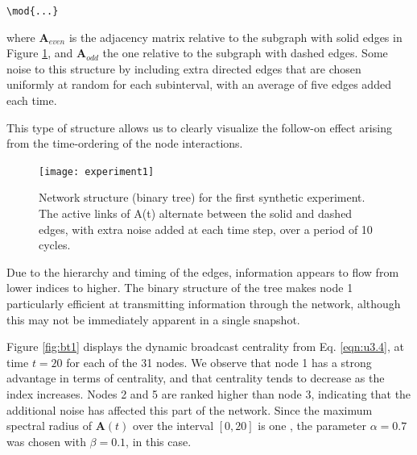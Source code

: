  \verb+\mod{...}+


where $\mathbf{A}_{even}$ is the adjacency matrix relative to the subgraph with solid edges in Figure \ref{fig:exp1}, and $\mathbf{A}_{odd}$ the one relative to the subgraph with dashed edges. Some noise  to this structure  by including extra directed edges that are chosen uniformly at random for each subinterval, with an average of five edges added each time.


This type of structure allows us to clearly visualize the follow-on effect arising from the time-ordering of the node interactions.

\begin{figure}[h]\centering
    \texttt{[image: experiment1]}
    \caption{Network structure (binary tree) for the first synthetic experiment. The active links of A(t)  alternate between the solid and dashed edges, with extra noise added at each time step, over a period of 10 cycles.}
    \label{fig:exp1}
    \bigskip
\end{figure}

Due to the hierarchy and timing of the edges, information appears to flow from lower indices to higher. The binary structure of the tree makes node 1  particularly efficient at transmitting information through the network, although this may not be immediately apparent in a single snapshot.


Figure \ref{fig:bt1} displays the dynamic broadcast centrality from Eq. \ref{eqn:u3.4}, at time $t=20$ for each of the 31 nodes. We observe that node 1 has a strong advantage in terms of centrality, and that centrality tends to decrease as the index increases. Nodes 2 and 5 are ranked higher than node 3, indicating that the additional noise has affected this part of the network. Since the maximum spectral radius of $\mathbf{A}(t)$ over the interval $[0, 20]$ is one , the parameter $\alpha=0.7$ was chosen with $\beta=0.1$, in this case. 

